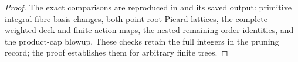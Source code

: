 \begin{proof}
The exact comparisons are reproduced in
 and its saved output:
primitive integral fibre-basis changes, both-point root Picard
lattices, the complete weighted deck and finite-action maps,
the nested remaining-order identities, and the product-cap
blowup. These checks retain the full integers in the pruning
record; the proof establishes them for arbitrary finite trees.
\end{proof}


